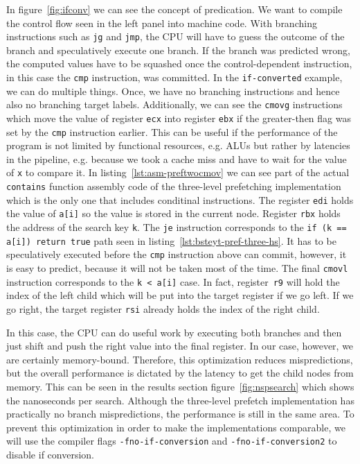 \documentclass{article}
\begin{document}
In figure~\ref{fig:ifconv} we can see the concept of predication. We want to compile the control flow seen in the left panel into machine code. With branching instructions such as \texttt{jg} and \texttt{jmp}, the CPU will have to guess the outcome of the branch and speculatively execute one branch. If the branch was predicted wrong, the computed values have to be squashed once the control-dependent instruction, in this case the \texttt{cmp} instruction, was committed. In the \texttt{if-converted} example, we can do multiple things. Once, we have no branching instructions and hence also no branching target labels. Additionally, we can see the \texttt{cmovg} instructions which move the value of register \texttt{ecx} into register \texttt{ebx} if the greater-then flag was set by the \texttt{cmp} instruction earlier. This can be useful if the performance of the program is not limited by functional resources, e.g. ALUs but rather by latencies in the pipeline, e.g. because we took a cache miss and have to wait for the value of \texttt{x} to compare it. In listing~\ref{lst:asm-preftwocmov} we can see part of the actual \texttt{contains} function assembly code of the three-level prefetching implementation which is the only one that includes conditinal instructions. The register \texttt{edi} holds the value of \texttt{a[i]} so the value is stored in the current node. Register \texttt{rbx} holds the address of the search key \texttt{k}. The \texttt{je} instruction corresponds to the \texttt{if (k == a[i]) return true} path seen in listing~\ref{lst:bsteyt-pref-three-hs}. It has to be speculatively executed before the \texttt{cmp} instruction above can commit, however, it is easy to predict, because it will not be taken most of the time. The final \texttt{cmovl} instruction corresponds to the \texttt{k < a[i]} case. In fact, register~\texttt{r9} will hold the index of the left child which will be put into the target register if we go left. If we go right, the target register \texttt{rsi} already holds the index of the right child.  



In this case, the CPU can do useful work by executing both branches and then just shift and push the right value into the final register. In our case, however, we are certainly memory-bound. Therefore, this optimization reduces mispredictions, but the overall performance is dictated by the latency to get the child nodes from memory. This can be seen in the results section figure~\ref{fig:nspsearch} which shows the nanoseconds per search. Although the three-level prefetch implementation has practically no branch mispredictions, the performance is still in the same area. To prevent this optimization in order to make the implementations comparable, we will use the compiler flags \texttt{-fno-if-conversion} and \texttt{-fno-if-conversion2} to disable if conversion. 
\end{document}

